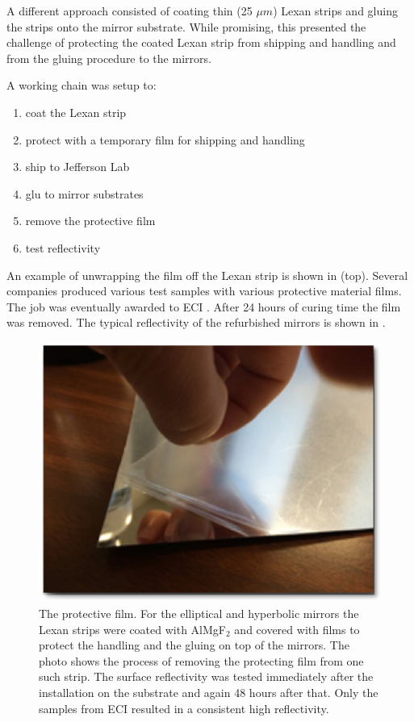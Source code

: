 A different approach consisted of coating thin (25 $\mu m$) Lexan strips and gluing the strips onto the mirror substrate. While promising, this
presented the challenge of protecting the coated Lexan strip from shipping and handling and from the gluing procedure to the mirrors.

A working chain was setup to:

\begin{enumerate}
	\item coat the Lexan strip
	\item protect with a temporary film for shipping and handling
	\item ship to Jefferson Lab
	\item glu to mirror substrates
	\item remove the protective film
	\item test reflectivity
\end{enumerate}

An example of unwrapping the film off the Lexan strip is shown in  (top). Several companies produced various test samples with
various protective material films. The job was eventually awarded to ECI \cite{ECI}.
After 24 hours of curing time the film was removed.
The typical reflectivity of the refurbished mirrors is shown in .


\begin{figure}[ht]
\centering
	\includegraphics[width=0.98\columnwidth,keepaspectratio]{img/filmOnStrip.png}
	\caption{The protective film. For the elliptical and hyperbolic mirrors the Lexan strips were coated with AlMgF$_2$
				and covered with films to protect the handling and the
				gluing on top of the mirrors. The photo shows the process of removing the
            protecting film from one such strip. The surface reflectivity was tested immediately after the installation on the substrate and again
            48 hours after that. Only the samples from ECI \cite{ECI} resulted in a consistent high reflectivity. }
	\label{fig:filmOnStrip}
\end{figure}


